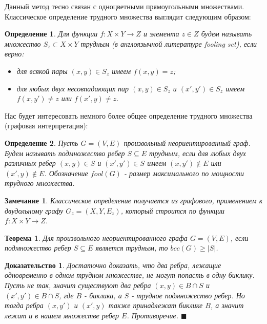\documentclass[a4paper]{article}
\newtheorem*{mremark}{Замечание}
\newtheorem*{mdefinition}{Определение}
\newtheorem*{mtheorem}{Теорема}
\newtheorem*{msolution}{Доказательство}
\begin{document}
Данный метод тесно связан с одноцветными прямоугольными множествами. Классическое определение 
трудного множества выглядит следующим образом:

\begin{mdefinition}
	Для функции $f: X\times Y \rightarrow Z$ и элемента $z\in Z$ будем называть множество 
	$S_z\subset X\times Y$ трудным (в англоязычной литературе fooling set), если верно:
	\begin{itemize}[noitemsep]
		\item для всякой пары $(x, y)\in S_z$ имеем $f(x, y) = z$;
		\item для любых двух несовпадающих пар $(x, y)\in S_z$ и $(x', y')\in S_z$ имеем 
		$f(x, y') \neq z$ или $f(x', y) \neq z$.
	\end{itemize}
\end{mdefinition}

Нас будет интересовать немного более общее определение трудного множества (графовая интерпретация):
\begin{mdefinition}
	Пусть $G = (V, E)$ произвольный неориентированный граф. Будем называть подмножество ребер 
	$S \subseteq E$ трудным, если для любых двух различных ребер $(x, y)\in S$ и $(x', y')\in S$ 
	имеем $(x, y') \notin E$ или $(x', y) \notin E$. Обозначение $fool(G)$ - размер максимального по 
	мощности трудного множества.
\end{mdefinition}

\begin{mremark}
	Классическое определение получается из графового, применением к двудольному графу $G_z = (X, Y, E_z)$, 
	который строится по функции $f: X\times Y \rightarrow Z$.
\end{mremark}

	
\begin{mtheorem}
    Для произвольного неориентированного графа $G = (V, E)$, если подмножество ребер $S \subseteq E$ 
    является трудным, то $bcc(G) \geq |S|$.
\end{mtheorem}

\begin{msolution}
    Достаточно доказать, что два ребра, лежащие одновременно в одном трудном множестве, не могут 
    попасть в одну биклику. Пусть не так, значит существуют два ребра $(x, y)\in B\cap S$ и 
    $(x', y')\in B\cap S$, где $B$ - биклика, а $S$ - трудное подмножество ребер. Но тогда ребра 
    $(x, y')$ и $(x', y)$ также принадлежат биклике $B$, а значит лежат и в нашем множестве ребер 
    $E$. Противоречие. $\blacksquare$
\end{msolution}
\end{document}
